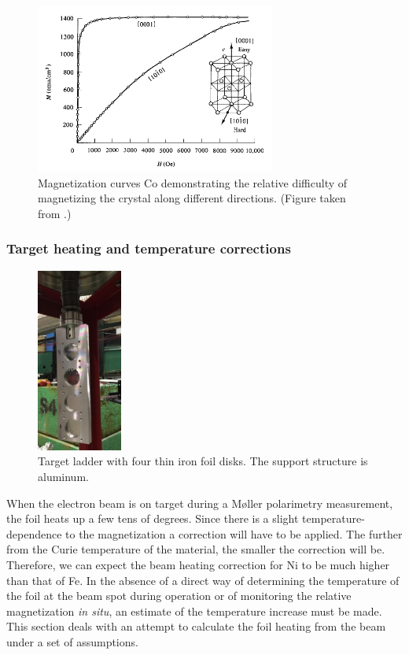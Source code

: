 \documentclass[12pt]{article}
\begin{document}
\begin{figure}[ht]
\centering
\includegraphics[width=0.7\textwidth]{anisotropy_Co.png}
\caption{Magnetization curves Co demonstrating the relative difficulty of magnetizing the crystal along different directions. (Figure taken from \cite{Cullity2008}.)}
\label{fig:anisotropy_Co}
\end{figure}
\FloatBarrier
\subsubsection{Target heating and temperature corrections}
\begin{figure}
\vspace{-20pt}
\centering
\includegraphics[width=0.25\textwidth]{target_ladder.png}
\caption{Target ladder with four thin iron foil disks. The support structure is aluminum.}
\label{fig:target_ladder}
\end{figure}
When the electron beam is on target during a M\o ller polarimetry measurement, the foil heats up a few tens of degrees. Since there is a slight temperature-dependence to the magnetization a correction will have to be applied. The further from the Curie temperature of the material, the smaller the correction will be. Therefore, we can expect the beam heating correction for Ni to be much higher than that of Fe. In the absence of a direct way of determining the temperature of the foil at the beam spot during operation or of monitoring the relative magnetization {\it in situ}, an estimate of the temperature increase must be made. This section deals with an attempt to calculate the foil heating from the beam under a set of assumptions.
\end{document}
